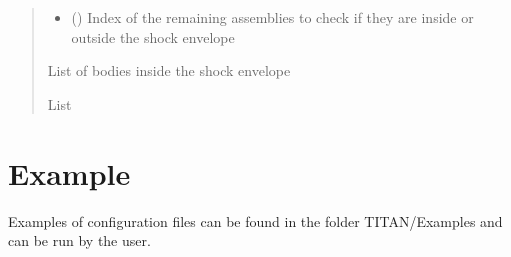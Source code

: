 \documentclass[letterpaper,10pt,english]{sphinxmanual}
\begin{document}
\begin{fulllineitems}
\begin{quote}
\begin{description}
\begin{itemize}
\item {} 
\sphinxAtStartPar
{} (\sphinxstyleliteralemphasis{\sphinxupquote{(}}\sphinxstyleliteralemphasis{\sphinxupquote{)}}) \textendash{} Index of the remaining assemblies to check if they are inside or outside the shock envelope

\end{itemize}

\sphinxAtStartPar
{} \textendash{} List of bodies inside the shock envelope

\sphinxAtStartPar
List

\end{description}\end{quote}

\end{fulllineitems}


\sphinxstepscope


\chapter{Example}
\label{\detokenize{example:example}}\label{\detokenize{example::doc}}
\sphinxAtStartPar
Examples of configuration files can be found in the folder TITAN/Examples and can be run by the user.



\renewcommand{\indexname}{Index}
\printindex
\end{document}
